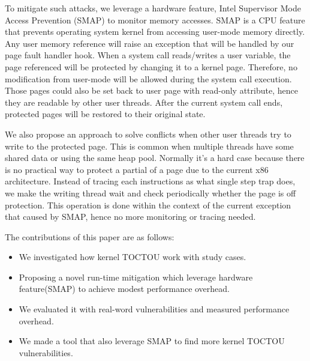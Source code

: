 To mitigate such attacks, we leverage a hardware feature, Intel Supervisor Mode Access Prevention (SMAP) to monitor memory accesses. SMAP is a CPU feature that prevents operating system kernel from accessing user-mode memory directly. Any user memory reference will raise an exception that will be handled by our page fault handler hook. When a system call reads/writes a user variable, the page referenced will be protected by changing it to a kernel page. Therefore, no modification from user-mode will be allowed during the system call execution. Those pages could also be set back to user page with read-only attribute, hence they are readable by other user threads. After the current system call ends, protected pages will be restored to their original state.

We also propose an approach to solve conflicts when other user threads try to write to the protected page. This is common when multiple threads have some shared data or using the same heap pool. Normally it's a hard case because there is no practical way to protect a partial of a page due to the current x86 architecture. Instead of tracing each instructions as what single step trap does, we make the writing thread wait and check periodically whether the page is off protection. This operation is done within the context of the current exception that caused by SMAP, hence no more monitoring or tracing needed. 


The contributions of this paper are as follows:
\begin{itemize}
    \item We investigated how kernel TOCTOU work with study cases.
    \item Proposing a novel run-time mitigation which leverage hardware feature(SMAP) to achieve modest performance overhead. 
    \item We evaluated it with real-word vulnerabilities and measured performance overhead.
    \item We made a tool that also leverage SMAP to find more kernel TOCTOU vulnerabilities.
\end{itemize}

